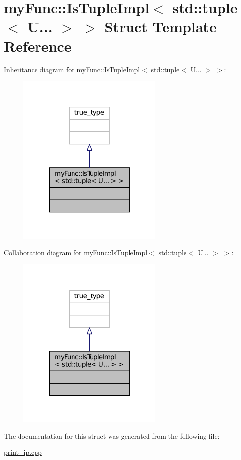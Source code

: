 \hypertarget{structmyFunc_1_1IsTupleImpl_3_01std_1_1tuple_3_01U_8_8_8_01_4_01_4}{}\section{my\+Func\+:\+:Is\+Tuple\+Impl$<$ std\+:\+:tuple$<$ U... $>$ $>$ Struct Template Reference}
\label{structmyFunc_1_1IsTupleImpl_3_01std_1_1tuple_3_01U_8_8_8_01_4_01_4}


Inheritance diagram for my\+Func\+:\+:Is\+Tuple\+Impl$<$ std\+:\+:tuple$<$ U... $>$ $>$\+:
\nopagebreak
\begin{figure}[H]
\begin{center}
\leavevmode
\includegraphics[width=203pt]{structmyFunc_1_1IsTupleImpl_3_01std_1_1tuple_3_01U_8_8_8_01_4_01_4__inherit__graph}
\end{center}
\end{figure}


Collaboration diagram for my\+Func\+:\+:Is\+Tuple\+Impl$<$ std\+:\+:tuple$<$ U... $>$ $>$\+:
\nopagebreak
\begin{figure}[H]
\begin{center}
\leavevmode
\includegraphics[width=203pt]{structmyFunc_1_1IsTupleImpl_3_01std_1_1tuple_3_01U_8_8_8_01_4_01_4__coll__graph}
\end{center}
\end{figure}


The documentation for this struct was generated from the following file\+:\begin{DoxyCompactItemize}
\item 
\hyperlink{print__ip_8cpp}{print\+\_\+ip.\+cpp}\end{DoxyCompactItemize}
